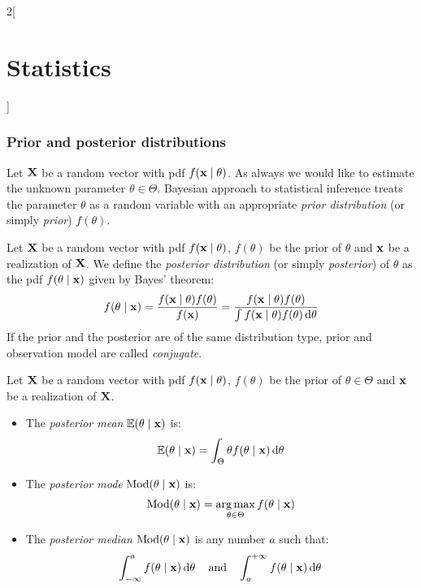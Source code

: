 \documentclass[../../../main.tex]{subfiles}
\begin{document}
\begin{multicols}{2}[\section{Statistics}]
  \subsubsection{Prior and posterior distributions}
  \begin{definition}
    Let $\boldsymbol{\mathrm{X}}$ be a random vector with pdf $f(\boldsymbol{\mathrm{x}}\mid \theta)$. As always we would like to estimate the unknown parameter $\theta\in\Theta$. Bayesian approach to statistical inference treats the parameter $\theta$ as a random variable with an appropriate \emph{prior distribution} (or simply \emph{prior}) $f(\theta)$.
  \end{definition}
  \begin{definition}
    Let $\boldsymbol{\mathrm{X}}$ be a random vector with pdf $f(\boldsymbol{\mathrm{x}}\mid \theta)$, $f(\theta)$ be the prior of $\theta$ and $\boldsymbol{\mathrm{x}}$ be a realization of $\boldsymbol{\mathrm{X}}$. We define the \emph{posterior distribution} (or simply \emph{posterior}) of $\theta$ as the pdf $f(\theta\mid \boldsymbol{\mathrm{x}})$ given by Bayes' theorem: $$f(\theta\mid\boldsymbol{\mathrm{x}})=\frac{f(\boldsymbol{\mathrm{x}}\mid\theta)f(\theta)}{f(\boldsymbol{\mathrm{x}})}=\frac{f(\boldsymbol{\mathrm{x}}\mid\theta)f(\theta)}{\int f(\boldsymbol{\mathrm{x}}\mid\theta)f(\theta)\dd{\theta}}$$
    If the prior and the posterior are of the same distribution type, prior and observation model are called \emph{conjugate}.
  \end{definition}
  \begin{definition}
    Let $\boldsymbol{\mathrm{X}}$ be a random vector with pdf $f(\boldsymbol{\mathrm{x}}\mid \theta)$, $f(\theta)$ be the prior of $\theta\in\Theta$ and $\boldsymbol{\mathrm{x}}$ be a realization of $\boldsymbol{\mathrm{X}}$.
    \begin{itemize}
      \item The \emph{posterior mean} $\mathbb{E}(\theta\mid\boldsymbol{\mathrm{x}})$ is: $$\mathbb{E}(\theta\mid\boldsymbol{\mathrm{x}})=\int_\Theta\theta f(\theta\mid\boldsymbol{\mathrm{x}})\dd{\theta}$$
      \item The \emph{posterior mode} $\operatorname{Mod}(\theta\mid\boldsymbol{\mathrm{x}})$ is: $$\operatorname{Mod}(\theta\mid\boldsymbol{\mathrm{x}})=\operatorname*{arg\,max}_{\theta\in\Theta} f(\theta\mid\boldsymbol{\mathrm{x}})$$
      \item The \emph{posterior median} $\operatorname{Mod}(\theta\mid\boldsymbol{\mathrm{x}})$ is any number $a$ such that: $$\int_{-\infty}^af(\theta\mid\boldsymbol{\mathrm{x}})\dd{\theta}\quad\text{and}\quad\int_a^{+\infty}f(\theta\mid\boldsymbol{\mathrm{x}})\dd{\theta}$$
    \end{itemize}
  \end{definition}

\end{multicols}
\end{document}
